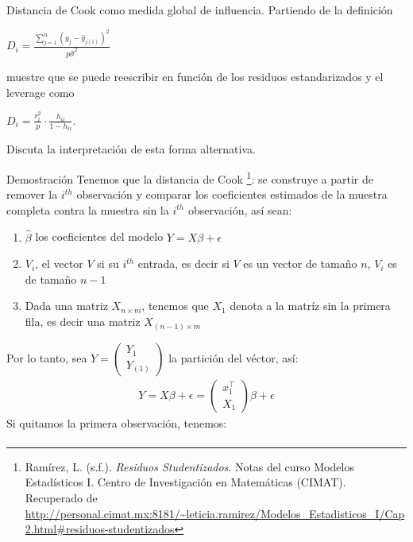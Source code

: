 \documentclass[a4paper,11pt]{article}
\begin{document}
\newpage
\begin{ejercicio}{7}
    Distancia de Cook como medida global de influencia.
    Partiendo de la definición

    $D_i = \frac{\sum_{j=1}^{n} (y_j - \hat{y}_{j(i)})^2}{p\hat{\sigma}^2}$

    muestre que se puede reescribir en función de los residuos estandarizados y el leverage
    como

    $D_i = \frac{r_i^2}{p} \cdot \frac{h_{ii}}{1 - h_{ii}}$.

    Discuta la interpretación de esta forma alternativa.
\end{ejercicio}
\begin{demostracion}{Demostración}
    Tenemos que la distancia de Cook \footnote{Ramírez, L. (s.f.). \textit{Residuos Studentizados}. Notas del curso Modelos Estadísticos I. Centro de Investigación en Matemáticas (CIMAT). Recuperado de \url{http://personal.cimat.mx:8181/~leticia.ramirez/Modelos_Estadisticos_I/Cap2.html#residuos-studentizados}}: se construye a partir de remover la $i^{th}$ observación y comparar los coeficientes estimados de la muestra completa contra la muestra sin la $i^{th}$ observación, así sean:
    \begin{enumerate}
        \item $\hat{\beta}$ los coeficientes del modelo $Y=X\beta+\epsilon$
        \item $V_{i} $, el vector $V$ si su $i^{th} $ entrada, es decir si $V$ es un vector de tamaño $n$, $V_{i} $ es de tamaño $n-1$
        \item Dada una matriz $X_{n\times m} $, tenemos que $X_{1} $ denota a la matríz sin la primera fila, es decir una matriz  $X_{(n-1)\times m} $
    \end{enumerate}
    Por lo tanto, sea $Y=\begin{pmatrix}
            Y_1 \\
            Y_{(1)}
        \end{pmatrix} $ la partición del véctor, así:
    \begin{align*}
        Y=X\beta+\epsilon=\begin{pmatrix}
                              x_1^\top \\
                              X_1
                          \end{pmatrix}\beta+\epsilon
    \end{align*}
    Si quitamos la primera observación, tenemos:
    \begin{align*}

\end{align*}
\end{demostracion}
\end{document}

